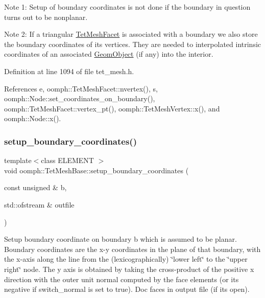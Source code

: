 Note 1\+: Setup of boundary coordinates is not done if the boundary in question turns out to be nonplanar.

Note 2\+: If a triangular \hyperlink{classoomph_1_1TetMeshFacet}{Tet\+Mesh\+Facet} is associated with a boundary we also store the boundary coordinates of its vertices. They are needed to interpolated intrinsic coordinates of an associated \hyperlink{classoomph_1_1GeomObject}{Geom\+Object} (if any) into the interior. 

Definition at line 1094 of file tet\+\_\+mesh.\+h.



References e, oomph\+::\+Tet\+Mesh\+Facet\+::nvertex(), s, oomph\+::\+Node\+::set\+\_\+coordinates\+\_\+on\+\_\+boundary(), oomph\+::\+Tet\+Mesh\+Facet\+::vertex\+\_\+pt(), oomph\+::\+Tet\+Mesh\+Vertex\+::x(), and oomph\+::\+Node\+::x().

\mbox{\label{classoomph_1_1TetMeshBase_aeb870f849736e2c5d29e54a9b50946ef}} 
\subsubsection{\texorpdfstring{setup\+\_\+boundary\+\_\+coordinates()}{setup\_boundary\_coordinates()}\hspace{0.1cm}{\footnotesize\ttfamily [4/4]}}
{\footnotesize\ttfamily template$<$class E\+L\+E\+M\+E\+NT $>$ \\
void oomph\+::\+Tet\+Mesh\+Base\+::setup\+\_\+boundary\+\_\+coordinates (\begin{DoxyParamCaption}\item[{const unsigned \&}]{b,  }\item[{std\+::ofstream \&}]{outfile }\end{DoxyParamCaption})\hspace{0.3cm}{\ttfamily [inline]}}



Setup boundary coordinate on boundary b which is assumed to be planar. Boundary coordinates are the x-\/y coordinates in the plane of that boundary, with the x-\/axis along the line from the (lexicographically) \char`\"{}lower left\char`\"{} to the \char`\"{}upper right\char`\"{} node. The y axis is obtained by taking the cross-\/product of the positive x direction with the outer unit normal computed by the face elements (or its negative if switch\+\_\+normal is set to true). Doc faces in output file (if it\textquotesingle{}s open). 


